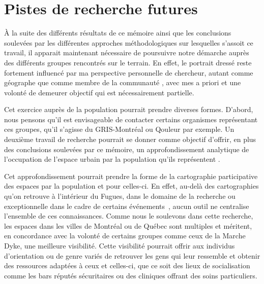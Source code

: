 \section*{Pistes de recherche futures}
\label{sec:pistes_de_recherches}

À la suite des différents résultats de ce mémoire ainsi que les conclusions soulevées par les différentes approches méthodologiques sur lesquelles s'assoit ce travail, il apparait maintenant nécessaire de poursuivre notre démarche auprès des différents groupes rencontrés sur le terrain.
En effet, le portrait dressé reste fortement influencé par ma perspective personnelle de chercheur, autant comme géographe que comme membre de la communauté \lgbt{}, avec mes a priori et une volonté de demeurer objectif qui est nécessairement partielle.

Cet exercice auprès de la population pourrait prendre diverses formes.
D'abord, nous pensons qu'il est envisageable de contacter certains organismes représentant ces groupes, qu'il s'agisse du GRIS-Montréal ou Qouleur par exemple.
Un deuxième travail de recherche pourrait se donner comme objectif d'offrir, en plus des conclusions soulevées par ce mémoire, un approfondissement analytique de l'occupation de l'espace urbain par la population qu'ils représentent .

Cet approfondissement pourrait prendre la forme de la cartographie participative des espaces \lgbt{} par la population et pour celles-ci.
En effet, au-delà des cartographies qu'on retrouve à l'intérieur du Fugues, dans le domaine de la recherche  ou exceptionnelle dans le cadre de certains événements~\parencite{Pervers/Cite2015}, aucun outil ne centralise l'ensemble de ces connaissances.
Comme nous le soulevons dans cette recherche, les espaces \lgbt{} dans les villes de Montréal ou de Québec sont multiples et méritent, en concordance avec la volonté de certains groupes comme ceux de la Marche Dyke, une meilleure visibilité.
Cette visibilité pourrait offrir aux individus d'orientation ou de genre variés de retrouver les gens qui leur ressemble et obtenir des ressources adaptées à ceux et celles-ci, que ce soit des lieux de socialisation comme les bars réputés sécuritaires ou des cliniques offrant des soins particuliers.


